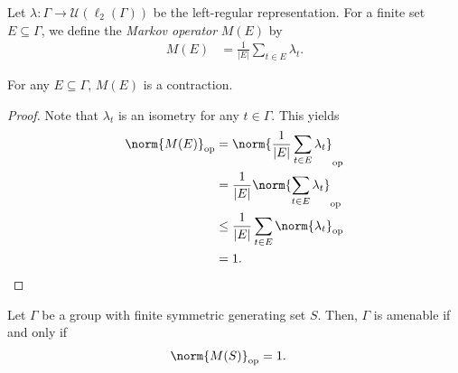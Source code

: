 \begin{definition}
  Let $\lambda\colon \Gamma\rightarrow \mathcal{U}\left( \ell_2\left( \Gamma \right) \right)$ be the left-regular representation. For a finite set $E\subseteq \Gamma$, we define the \textit{Markov operator} $M(E)$ by
  \begin{align*}
    M(E) &= \frac{1}{\left\vert E \right\vert} \sum_{t\in E}\lambda_t.
  \end{align*}
\end{definition}
\begin{fact}
  For any $E\subseteq \Gamma$, $M(E)$ is a contraction.
\end{fact}
\begin{proof}
  Note that $\lambda_t$ is an isometry for any $t\in \Gamma$. This yields
  \begin{align*}
    \norm{M(E)}_{\op} &= \norm{\frac{1}{\left\vert E \right\vert} \sum_{t\in E}\lambda_t}_{\op}\\
                      &= \frac{1}{\left\vert E \right\vert}\norm{\sum_{t\in E}\lambda_t}_{\op}\\
                      &\leq \frac{1}{\left\vert E \right\vert}\sum_{t\in E}\norm{\lambda_t}_{\op}\\
                      &= 1.
  \end{align*}
\end{proof}
\begin{theorem}
  Let $\Gamma$ be a group with finite symmetric generating set $S$. Then, $\Gamma$ is amenable if and only if
  \begin{align*}
    \norm{M(S)}_{\op} &= 1.
  \end{align*}
\end{theorem}
